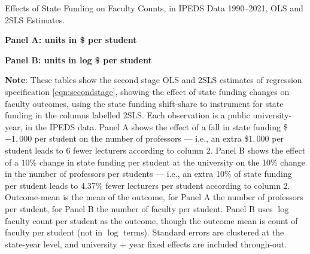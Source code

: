 \begin{table}[H]
    \singlespacing
    \centering
    \caption{Effects of State Funding on Faculty Counts, in IPEDS Data 1990--2021, OLS and 2SLS Estimates.}

    \textbf{Panel A: units in \$ per student}

    \makebox[\textwidth][c]{}
    
    \textbf{Panel B: units in log \$ per student}
    
    \makebox[\textwidth][c]{}

    \label{tab:facultycount-shock-reg}
    \justify
    \footnotesize
    \textbf{Note}:
    These tables show the second stage OLS and 2SLS estimates of regression specification \eqref{eqn:secondstage}, showing the effect of state funding changes on faculty outcomes, using the state funding shift-share to instrument for state funding in the columns labelled 2SLS.
    Each observation is a public university-year, in the IPEDS data.
    Panel A shows the effect of a fall in state funding \$$-1,000$ per student on the number of professors --- i.e.,
    an extra \$$1,000$ per student leads to 6 fewer lecturers according to column 2.
    Panel B shows the effect of a $10$\% change in state funding per student at the university on the 10\% change in the number of professors per students --- i.e.,
    an extra 10\% of state funding per student leads to 4.37\% fewer lecturers per student according to column 2.
    Outcome-mean is the mean of the outcome, for Panel A the number of professors per student, for Panel B the number of faculty per student.
    Panel B uses $\log$ faculty count per student as the outcome, though the outcome mean is count of faculty per student (not in $\log$ terms).
    Standard errors are clustered at the state-year level, and university $+$ year fixed effects are included through-out.
\end{table}

